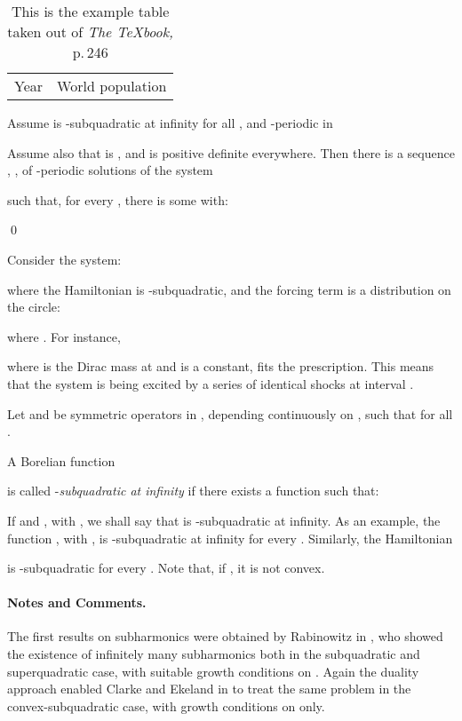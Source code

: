 \documentclass{llncs}
\begin{document}
\begin{table}
\caption{This is the example table taken out of {\it The
\TeX{}book,} p.\,246}
\begin{center}
\begin{tabular}{r@{\quad}rl}
\hline
\multicolumn{1}{l}{\rule{0pt}{12pt}
                   Year}&\multicolumn{2}{l}{World population}\2pt]
\hline
\end{tabular}
\end{center}
\end{table}
\begin{theorem} \label{ghou:pre}
Assume  is
-subquadratic at
infinity for all , and -periodic in 





Assume also that  is , and  is positive definite
everywhere. Then there is a sequence , , of
-periodic solutions of the system

such that, for every , there is some  with:

\qed
\end{theorem}
\begin{example} 
Consider the system:

where the Hamiltonian  is
-subquadratic, and the
forcing term is a distribution on the circle:

where . For instance,

where  is the Dirac mass at  and
 is a
constant, fits the prescription. This means that the system
 is being excited by a
series of identical shocks at interval .
\end{example}
\begin{definition}
Let  and  be symmetric
operators in , depending continuously on
, such that
 for all .

A Borelian function

is called
-{\it subquadratic at infinity}
if there exists a function  such that:





If  and
, with
,
we shall say that  is
-subquadratic
at infinity. As an example, the function
, with
, is -subquadratic at infinity
for every . Similarly, the Hamiltonian

is -subquadratic for every .
Note that, if , it is not convex.
\end{definition}

\paragraph{Notes and Comments.}
The first results on subharmonics were
obtained by Rabinowitz in \cite{rab}, who showed the existence of
infinitely many subharmonics both in the subquadratic and superquadratic
case, with suitable growth conditions on . Again the duality
approach enabled Clarke and Ekeland in \cite{clar:eke:2} to treat the
same problem in the convex-subquadratic case, with growth conditions on
 only.
\end{document}
